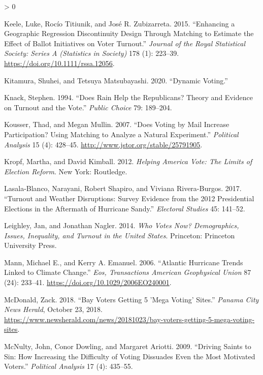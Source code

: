 \documentclass[
  12pt,
]{article}
\newlength{\cslhangindent}
\newenvironment{CSLReferences}[2] %
 {%
  \setlength{\parindent}{0pt}
  \ifodd #1 \everypar{\setlength{\hangindent}{\cslhangindent}}\ignorespaces\fi
  \ifnum #2 > 0
  \setlength{\parskip}{#2\baselineskip}
  \fi
 }%
 {}
\begin{document}
\begin{CSLReferences}{1}{0}
\leavevmode\hypertarget{ref-Keele2015a}{}%
Keele, Luke, Rocío Titiunik, and José R. Zubizarreta. 2015. {``Enhancing a Geographic Regression Discontinuity Design Through Matching to Estimate the Effect of Ballot Initiatives on Voter Turnout.''} \emph{Journal of the Royal Statistical Society: Series A (Statistics in Society)} 178 (1): 223--39. \url{https://doi.org/10.1111/rssa.12056}.

\leavevmode\hypertarget{ref-Kitamura2020}{}%
Kitamura, Shuhei, and Tetsuya Matsubayashi. 2020. {``Dynamic {Voting}.''}

\leavevmode\hypertarget{ref-Knack1994}{}%
Knack, Stephen. 1994. {``Does {Rain Help} the {Republicans}? {Theory} and {Evidence} on {Turnout} and the {Vote}.''} \emph{Public Choice} 79: 189--204.

\leavevmode\hypertarget{ref-Kousser2007}{}%
Kousser, Thad, and Megan Mullin. 2007. {``Does {Voting} by {Mail Increase Participation}? {Using Matching} to {Analyze} a {Natural Experiment}.''} \emph{Political Analysis} 15 (4): 428--45. \url{http://www.jstor.org/stable/25791905}.

\leavevmode\hypertarget{ref-Kropf2012}{}%
Kropf, Martha, and David Kimball. 2012. \emph{Helping {America Vote}: {The Limits} of {Election Reform}}. {New York}: {Routledge}.

\leavevmode\hypertarget{ref-Lasala-Blanco2017}{}%
Lasala-Blanco, Narayani, Robert Shapiro, and Viviana Rivera-Burgos. 2017. {``Turnout and {Weather Disruptions}: {Survey Evidence} from the 2012 {Presidential Elections} in the {Aftermath} of {Hurricane Sandy}.''} \emph{Electoral Studies} 45: 141--52.

\leavevmode\hypertarget{ref-Leighley2014}{}%
Leighley, Jan, and Jonathan Nagler. 2014. \emph{Who {Votes Now}? {Demographics}, {Issues}, {Inequality}, and {Turnout} in the {United States}}. {Princeton}: {Princeton University Press}.

\leavevmode\hypertarget{ref-Mann2006}{}%
Mann, Michael E., and Kerry A. Emanuel. 2006. {``Atlantic Hurricane Trends Linked to Climate Change.''} \emph{Eos, Transactions American Geophysical Union} 87 (24): 233--41. \url{https://doi.org/10.1029/2006EO240001}.

\leavevmode\hypertarget{ref-McDonald2018}{}%
McDonald, Zack. 2018. {``Bay Voters Getting 5 'Mega Voting' Sites.''} \emph{Panama City News Herald}, October 23, 2018. \url{https://www.newsherald.com/news/20181023/bay-voters-getting-5-mega-voting-sites}.

\leavevmode\hypertarget{ref-McNulty2009}{}%
McNulty, John, Conor Dowling, and Margaret Ariotti. 2009. {``Driving {Saints} to {Sin}: {How Increasing} the {Difficulty} of {Voting Dissuades Even} the {Most Motivated Voters}.''} \emph{Political Analysis} 17 (4): 435--55.


\end{CSLReferences}
\end{document}
